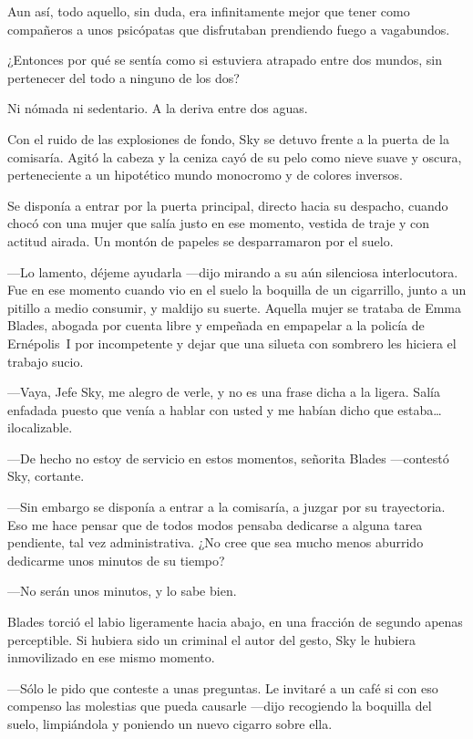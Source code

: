 Aun así, todo aquello, sin duda, era infinitamente mejor que tener como compañeros a unos psicópatas que disfrutaban prendiendo fuego a vagabundos.

¿Entonces por qué se sentía como si estuviera atrapado entre dos mundos, sin pertenecer del todo a ninguno de los dos?

Ni nómada ni sedentario. A la deriva entre dos aguas.

Con el ruido de las explosiones de fondo, Sky se detuvo frente a la puerta de la comisaría. Agitó la cabeza y la ceniza cayó de su pelo como nieve suave y oscura, perteneciente a un hipotético mundo monocromo y de colores inversos.

Se disponía a entrar por la puerta principal, directo hacia su despacho, cuando chocó con una mujer que salía justo en ese momento, vestida de traje y con actitud airada. Un montón de papeles se desparramaron por el suelo.

---Lo lamento, déjeme ayudarla ---dijo mirando a su aún silenciosa interlocutora. Fue en ese momento cuando vio en el suelo la boquilla de un cigarrillo, junto a un pitillo a medio consumir, y maldijo su suerte. Aquella mujer se trataba de Emma Blades, abogada por cuenta libre y empeñada en empapelar a la policía de Ernépolis~I por incompetente y dejar que una silueta con sombrero les hiciera el trabajo sucio.

---Vaya, Jefe Sky, me alegro de verle, y no es una frase dicha a la ligera. Salía enfadada puesto que venía a hablar con usted y me habían dicho que estaba\dots{} ilocalizable.

---De hecho no estoy de servicio en estos momentos, señorita Blades ---contestó Sky, cortante.

---Sin embargo se disponía a entrar a la comisaría, a juzgar por su trayectoria. Eso me hace pensar que de todos modos pensaba dedicarse a alguna tarea pendiente, tal vez administrativa. ¿No cree que sea mucho menos aburrido dedicarme unos minutos de su tiempo?

---No serán unos minutos, y lo sabe bien.

Blades torció el labio ligeramente hacia abajo, en una fracción de segundo apenas perceptible. Si hubiera sido un criminal el autor del gesto, Sky le hubiera inmovilizado en ese mismo momento.

---Sólo le pido que conteste a unas preguntas. Le invitaré a un café si con eso compenso las molestias que pueda causarle ---dijo recogiendo la boquilla del suelo, limpiándola y poniendo un nuevo cigarro sobre ella.

